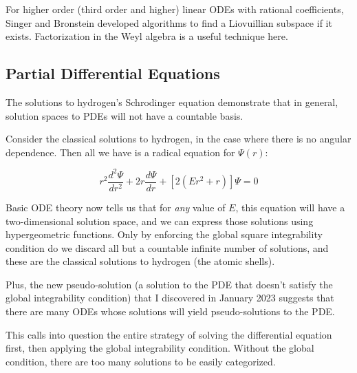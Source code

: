 \documentclass{article}
\begin{document}
For higher order (third order and higher) linear ODEs with rational coefficients, Singer and Bronstein
developed algorithms to find a Liovuillian subspace if it exists.
Factorization in the Weyl algebra is a useful technique here.

\subsection*{Partial Differential Equations}

The solutions to hydrogen's Schrodinger equation demonstrate that in general,
solution spaces to PDEs will not have a countable basis.

Consider the classical solutions to hydrogen, in the case where there
is no angular dependence.  Then all we have is a radical equation for $\Psi(r)$:

\[ r^2 \frac{d^2\Psi}{dr^2} + 2r \frac{d\Psi}{dr} + \left[2(E r^2+r)\right] \Psi = 0 \]

Basic ODE theory now tells us that for {\it any} value of $E$, this equation
will have a two-dimensional solution space, and we can express those solutions
using hypergeometric functions.  Only by enforcing the global square integrability
condition do we discard all but a countable infinite number of solutions, and
these are the classical solutions to hydrogen (the atomic shells).

Plus, the new pseudo-solution (a solution to the PDE that doesn't satisfy the global integrability condition)
that I discovered in January 2023 suggests that
there are many ODEs whose solutions will yield pseudo-solutions to the PDE.

This calls into
question the entire strategy of solving the differential equation first,
then applying the global integrability condition.  Without the global
condition, there are too many solutions to be easily categorized.
\end{document}
